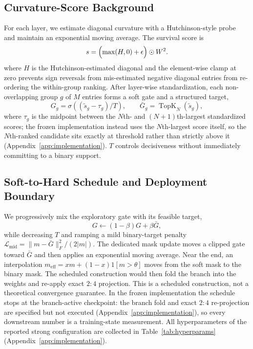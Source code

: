 \documentclass{article}
\begin{document}
\subsection{Curvature-Score Background}
For each layer, we estimate diagonal curvature with a Hutchinson-style probe~\citep{hutchinson1990trace} and maintain an exponential moving average. The survival score is
\begin{equation}
s=\Bigl(\max(H,0)+\epsilon\Bigr)\odot W^2.
\end{equation}
where $H$ is the Hutchinson-estimated diagonal and the element-wise clamp at zero prevents sign reversals from mis-estimated negative diagonal entries from re-ordering the within-group ranking.
After layer-wise standardization, each non-overlapping group $g$ of $M$ entries forms a soft gate and a structured target,
\begin{equation}
G_g=\sigma\!\left((\widetilde s_g-\tau_g)/T\right),\qquad
\bar G_g=\operatorname{TopK}_{N}(\widetilde s_g),
\end{equation}
where $\tau_g$ is the midpoint between the $N$th- and $(N{+}1)$th-largest standardized scores; the frozen implementation instead uses the $N$th-largest score itself, so the $N$th-ranked candidate sits exactly at threshold rather than strictly above it (Appendix~\ref{app:implementation}). $T$ controls decisiveness without immediately committing to a binary support.

\subsection{Soft-to-Hard Schedule and Deployment Boundary}
We progressively mix the exploratory gate with its feasible target,
\begin{equation}
G\leftarrow(1-\beta)G+\beta\bar G,
\end{equation}
while decreasing $T$ and ramping a mild binary-target penalty $\mathcal{L}_{\mathrm{mid}}=\lVert m-\bar G\rVert_F^2/(2|m|)$. The dedicated mask update moves a clipped gate toward $\bar G$ and then applies an exponential moving average. Near the end, an interpolation $m_{\mathrm{eff}}=xm+(1-x)\mathrm{1}[m>\theta]$ moves from the soft mask to the binary mask. The scheduled construction would then fold the branch into the weights and re-apply exact $2{:}4$ projection. This is a scheduled construction, not a theoretical convergence guarantee. In the frozen implementation the schedule stops at the branch-active checkpoint: the branch fold and exact $2{:}4$ re-projection are specified but not executed (Appendix~\ref{app:implementation}), so every downstream number is a training-state measurement.
All hyperparameters of the reported strong configuration are collected in
Table~\ref{tab:hyperparams} (Appendix~\ref{app:implementation}).
\end{document}
